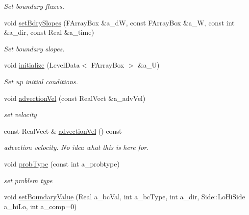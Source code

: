 \begin{DoxyCompactItemize}
\begin{DoxyCompactList}\small\item\em Set boundary fluxes. \end{DoxyCompactList}\item 
void \hyperlink{class_advect_i_b_c_a5410c1910c93274665fe324a5c6b3be9}{set\-Bdry\-Slopes} (F\-Array\-Box \&a\-\_\-d\-W, const F\-Array\-Box \&a\-\_\-\-W, const int \&a\-\_\-dir, const Real \&a\-\_\-time)
\begin{DoxyCompactList}\small\item\em Set boundary slopes. \end{DoxyCompactList}\item 
void \hyperlink{class_advect_i_b_c_abd44c883d18c238c99456b57d974f9dc}{initialize} (Level\-Data$<$ F\-Array\-Box $>$ \&a\-\_\-\-U)
\begin{DoxyCompactList}\small\item\em Set up initial conditions. \end{DoxyCompactList}\item 
\hypertarget{class_advect_i_b_c_ab09d9d22d56f103e39e08884fb4b6217}{void \hyperlink{class_advect_i_b_c_ab09d9d22d56f103e39e08884fb4b6217}{advection\-Vel} (const Real\-Vect \&a\-\_\-adv\-Vel)}\label{class_advect_i_b_c_ab09d9d22d56f103e39e08884fb4b6217}

\begin{DoxyCompactList}\small\item\em set velocity \end{DoxyCompactList}\item 
\hypertarget{class_advect_i_b_c_a249a4f558a5cfa9b51874cc6d51df02a}{const Real\-Vect \& \hyperlink{class_advect_i_b_c_a249a4f558a5cfa9b51874cc6d51df02a}{advection\-Vel} () const }\label{class_advect_i_b_c_a249a4f558a5cfa9b51874cc6d51df02a}

\begin{DoxyCompactList}\small\item\em advection velocity. No idea what this is here for. \end{DoxyCompactList}\item 
\hypertarget{class_advect_i_b_c_ab835398d8c5f12740518e69d47e8cad2}{void \hyperlink{class_advect_i_b_c_ab835398d8c5f12740518e69d47e8cad2}{prob\-Type} (const int a\-\_\-probtype)}\label{class_advect_i_b_c_ab835398d8c5f12740518e69d47e8cad2}

\begin{DoxyCompactList}\small\item\em set problem type \end{DoxyCompactList}\item 
\hypertarget{class_advect_i_b_c_a9d9cb1bf0ce09b8f4ce0429b850221a7}{void \hyperlink{class_advect_i_b_c_a9d9cb1bf0ce09b8f4ce0429b850221a7}{set\-Boundary\-Value} (Real a\-\_\-bc\-Val, int a\-\_\-bc\-Type, int a\-\_\-dir, Side\-::\-Lo\-Hi\-Side a\-\_\-hi\-Lo, int a\-\_\-comp=0)}\label{class_advect_i_b_c_a9d9cb1bf0ce09b8f4ce0429b850221a7}


\end{DoxyCompactItemize}

